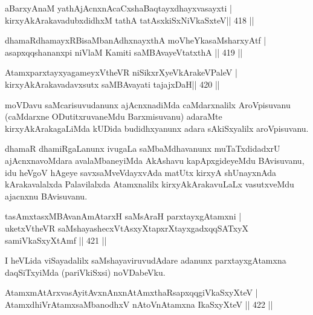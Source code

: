 \begin{shl}
aBarxyAnaM yathA\s jAcnxnAcaCxshaBaqtayxdhayxvasayxti | \\
kirxyAkArakavadubxdidhxM tathA tatAsxkiSxNiVkaSxteV\hfill||  418 ||  
\end{shl}

\begin{shl}
dhamaRdhamayxRBisaMbanAdhxnayxthA moVheYkasaMsharxyAtf | \\
asapxqqshananxpi niVlaM Kamiti saMBAvayeVtatxthA \hfill||  419 ||  
\end{shl}
				
\begin{shl}
AtamxparxtayxyagameyxV\s theVR niSikxrXyeV\s kArakeV\s PaleV | \\
kirxyAkArakavadavxsutx saMBAvayati tajajxDaH\hfill ||  420 ||  
\end{shl}

\begin{artha}
moVDavu saMcarisuvudanunx ajAcnxnadiMda caMdarxnalilx AroVpisuvanu (caMdarxne ODutitxruvaneMdu Barxmisuvanu) adaraMte kirxyAkArakagaLiMda kUDida budidhxyanunx adara sAkiSxyalilx aroVpisuvanu.
\end{artha}

\begin{artha}
dhamaR dhamiRgaLanunx ivugaLa saMbaMdhavanunx muTaTxdidadxrU ajAcnxnavoMdara avalaMbaneyiMda AkAshavu kapApxgideyeMdu BAvisuvanu, idu heVgoV hAgeye savxsaMveVdayxvAda matUtx kirxyA shUnayxnAda kArakavalalxda Palavilalxda Atamxnalilx kirxyAkArakavuLaLx vasutxveMdu ajacnxnu BAvisuvanu.
\end{artha}

\begin{shl}
tasAmxtasxMBAvanAmAtarxH saMsAraH parxtayxgAtamxni | \\
uketxV\s theVR saMshayashecxVtAsxyXtapxrXtayxgadxqqSATxyX samiVkaSxyXtAmf \hfill||  421 ||  
\end{shl}

\begin{artha}
I heVLida viSayadalilx saMshayaviruvudAdare adanunx parxtayxgAtamxna daqSiTxyiMda (pariVkiSxsi) noVDabeVku.
\end{artha}

\begin{shl}
AtamxmAtArxvasAyitAvxnAnxnAtAmxthaRsapxqqgiVkaSxyXteV | \\
AtamxdhiVrAtamxsaMbanodhxV nAtoV\s nAtamxna IkaSxyXteV \hfill||  422 ||  
\end{shl}

